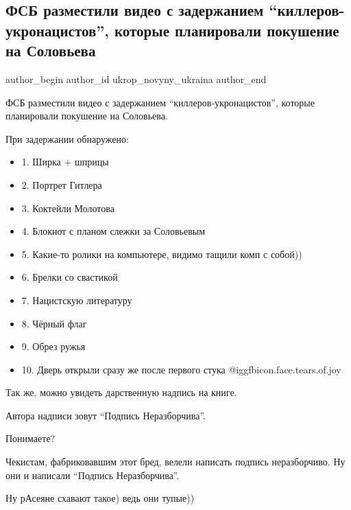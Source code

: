  
 
 
 
 
 
\subsection{ФСБ разместили видео с задержанием \enquote{киллеров-укронацистов}, которые планировали покушение на Соловьева}
\label{sec:25_04_2022.vk.ukrop_novyny_ukraina.1.fsb_killery_solovjeva}
 
\ifcmt
 author_begin
   author_id ukrop_novyny_ukraina
 author_end
\fi

ФСБ разместили видео с задержанием \enquote{киллеров-укронацистов}, которые планировали покушение на Соловьева.


При задержании обнаружено:

\begin{itemize}
  \item 1. Ширка + шприцы
  \item 2. Портрет Гитлера
  \item 3. Коктейли Молотова
  \item 4. Блокнот с планом слежки за Соловьевым
  \item 5. Какие-то ролики на компьютере, видимо тащили комп с собой))
  \item 6. Брелки со свастикой
  \item 7. Нацистскую литературу
  \item 8. Чёрный флаг
  \item 9. Обрез ружья
  \item 10. Дверь открыли сразу же после первого стука  @igg{fbicon.face.tears.of.joy} 
\end{itemize}


Так же, можно увидеть дарственную надпись на книге.

Автора надписи зовут \enquote{Подпись Неразборчива}.

Понимаете?

Чекистам, фабриковавшим этот бред, велели написать подпись неразборчиво. Ну они
и написали \enquote{Подпись Неразборчива}.

Ну рАсеяне схавают такое) ведь они тупые))

